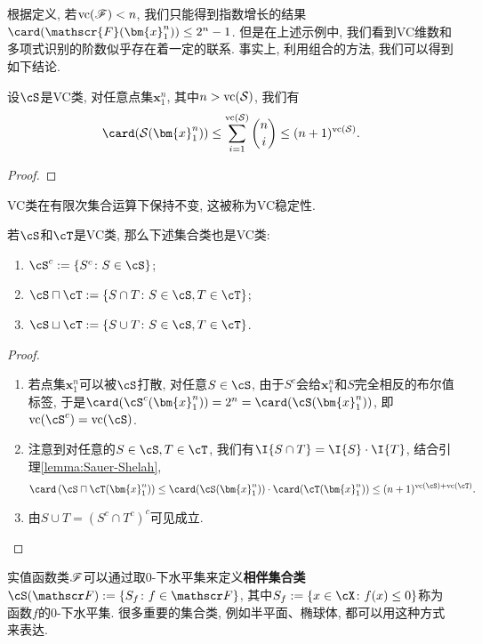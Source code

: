 根据定义, 若$\mathrm{vc}(\mathscr{F}) < n$, 我们只能得到指数增长的结果$\card(\mathscr{F}(\bm{x}_1^n)) \leq 2^n - 1$.
但是在上述示例中, 我们看到VC维数和多项式识别的阶数似乎存在着一定的联系.
事实上, 利用组合的方法, 我们可以得到如下结论. 
\begin{lemma}\label{lemma:Sauer-Shelah}
	设$\cS$是VC类, 对任意点集$\bm{x}_1^n$, 其中$n > \mathrm{vc}(\mathcal{S})$, 我们有
	\begin{equation*}
		\card(\mathcal{S}(\bm{x}_1^n))
		\leq \sum_{i=1}^{\vc(\mathcal{S})} \binom ni
		\leq (n+1)^{\vc(\mathcal{S})}. 
	\end{equation*}
\end{lemma}
\begin{proof}
	
\end{proof}

VC类在有限次集合运算下保持不变, 这被称为VC稳定性. 
\begin{proposition}[VC稳定性]
	若$\cS$和$\cT$是VC类, 那么下述集合类也是VC类: 
	\begin{enumerate}[label=(\arabic*)]
		\item $\cS^c := \{S^c \colon S \in \cS\}$;
		\item $\cS \sqcap \cT := \{S \cap T \colon S \in \cS, T \in \cT\}$;
		\item $\cS \sqcup \cT := \{S \cup T \colon S \in \cS, T \in \cT\}$.
	\end{enumerate}
\end{proposition}
\begin{proof}
	\begin{enumerate}[label=(\arabic*)]
		\item 若点集$\bm{x}_1^n$可以被$\cS$打散, 对任意$S \in \cS$, 由于$S^c$会给$\bm{x}_1^n$和$S$完全相反的布尔值标签, 于是$\card(\cS^c(\bm{x}_1^n)) = 2^n = \card(\cS(\bm{x}_1^n))$, 即$\vc(\cS^c) = \vc(\cS)$. 
		\item 注意到对任意的$S \in \cS, T \in \cT$, 我们有$\I{S \cap T} = \I{S} \cdot \I{T}$, 结合引理\ref{lemma:Sauer-Shelah}, 
			\begin{equation*}
				\card\left( \cS \sqcap \cT (\bm{x}_1^n) \right) 
				\leq \card(\cS(\bm{x}_1^n)) \cdot \card(\cT(\bm{x}_1^n))
				\leq (n+1)^{\vc(\cS) + \vc(\cT)}. 
			\end{equation*}
		\item 由$S \cup T = (S^c \cap T^c)^c$可见成立. 
	\end{enumerate}
\end{proof}


实值函数类$\mathscr{F}$可以通过取$0$-下水平集来定义\textbf{相伴集合类}$\cS(\sF):=\{S_f \colon f \in \sF\}$, 其中$S_f := \{x \in \cX \colon f(x) \leq 0\}$称为函数$f$的$0$-下水平集. 
很多重要的集合类, 例如半平面、椭球体, 都可以用这种方式来表达. 

